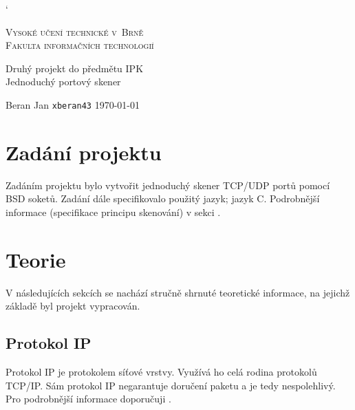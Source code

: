 \documentclass[a4paper, 11pt]{article}
\begin{document}
\catcode` %
\begin{titlepage}
	\begin{center}
		\Huge \textsc{Vysoké učení technické v~Brně}\\
		\huge \textsc{Fakulta informačních technologií}\\
		\begin{figure}[h]
		\begin{center}
		\end{center}
		\end{figure}

		\LARGE Druhý projekt do předmětu IPK \\
		\Huge {Jednoduchý portový skener}\\
		
		
		\Large Beran Jan \texttt{xberan43}  \Large\today\\
	 \end{center}
\end{titlepage}
\tableofcontents

\newpage
\section{Zadání projektu}
Zadáním projektu bylo vytvořit jednoduchý skener TCP/UDP portů pomocí BSD soketů. Zadání dále specifikovalo použitý jazyk; jazyk C. Podrobnější informace (specifikace principu skenování) v sekci .
\section{Teorie}
V následujících sekcích se nachází stručně shrnuté teoretické informace, na jejichž základě byl projekt vypracován.
\subsection{Protokol IP}
Protokol IP je protokolem síťové vrstvy. Využívá ho celá rodina protokolů TCP/IP. Sám protokol IP negarantuje doručení paketu a je tedy nespolehlivý. Pro podrobnější informace doporučuji \cite{rfc791}.
\end{document}
